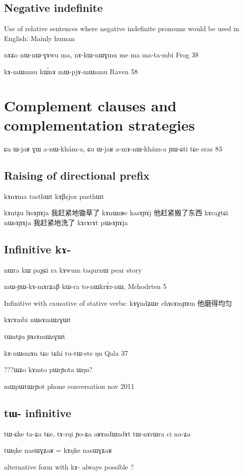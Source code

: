 \documentclass[oldfontcommands,oneside,a4paper,11pt]{memoir}
\begin{document}
\section{Negative indefinite}
Use of relative sentences where negative indefinite pronouns would be used in English: 
Mainly human

nɤʑo	nɯ-nɯ-ɣɤwu	ma,	nɤ-kɯ-nɯɣmu	me	ma	ma-ta-mbi
Frog 38
 

	kɤ-mɯnmu	kɯ́nɤ	mɯ-pjɤ-mɯnmu				
	Raven 58
	
	
	
\chapter{Complement clauses and complementation strategies}
ɕu ɯ-jaʁ ɣɯ a-nɯ-khám-a, ɕu ɯ-jaʁ a-mɤ-nɯ-khám-a ɲɯ-ɕti tɕe
sras 83


\section{Raising of directional prefix}
kɤnɤma tasthɯt
kɤβzjoz pasthɯt


kɤntʂu lɤsɤɲɤja
我赶紧地锄草了
 kɤnɯzʁe kasɤɲɤj
 他赶紧搬了东西
 kɤraχtɕi nɯsɤɲɤja
 我赶紧地洗了
kɤrɤrɤt pɯsɤɲɤja
 
\section{Infinitive kɤ-}
nɯra kɯ paχɕi ra kɤwum taqurnɯ
pear story

mɯ-ɲɯ-kɤ-mɤrʑaβ	kɯ-ra	to-nɯkrɤ́z-nɯ,
Mchodrten 5

Infinitive with causative of stative verbs:
kɤɣndʑɯr chɤsɤmɲɤm
 他磨得均匀

kɤrɤmbi nɯsɤmɯzɣɯt

tɯntʂu ɲɤsɤmɯzɣɯt



kɤ-nɯsmɤn	tɕe	tɕhi	tu-tɯ-ste	ŋu
Qala 37


???ɯʑo kɤmto pɯrɲota ɯŋu?

mɯpɯtɯrɲot
phone conversation nov 2011

\section{tɯ- infinitive} 
tɯ-ɕke ta-ʑa tɕe, 
tɤ-rŋi	ɲo-ʑa
aʁɤndɯndɤt	tɯ-nɤrɯra	ci	na-ʑa

tɯŋke nasɯɣʑaʁ = kɤŋke nasɯɣʑaʁ

alternative form with kɤ- always possible ?
\end{document}
